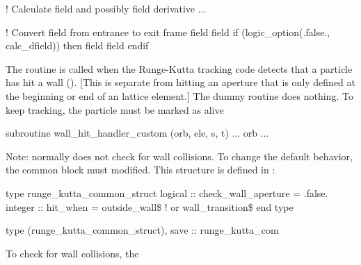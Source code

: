 {{{\begin{example}
  ! Calculate field and possibly field derivative
  ...

  ! Convert field from entrance to exit frame
  field%
  field%
  if (logic_option(.false., calc_dfield)) then
    field%
    field%
  endif
\end{example}


The  routine is called when the
Runge-Kutta tracking code  detects that a particle
has hit a wall (). [This is separate from hitting an
aperture that is only defined at the beginning or end of an lattice
element.] The dummy  routine does nothing.
To keep tracking, the particle must be marked as alive
\begin{example}
  subroutine wall_hit_handler_custom (orb, ele, s, t)
    ...
    orb%
    ...
\end{example}
Note:  normally does not check for wall collisions.
To change the default behavior, the  common block
must modified. This structure is defined in :
\begin{example}
  type runge_kutta_common_struct
    logical :: check_wall_aperture = .false.
    integer :: hit_when = outside_wall\$   ! or wall_transition\$
  end type

  type (runge_kutta_common_struct), save :: runge_kutta_com
\end{example}
To check for wall collisions, the \vn{%
must be set to true. The \vn{%
constitutes a collision. If this is set to \vn{outside_wall\$} (the
default), then any particle that is outside the wall is considered to
have hit the wall. If \vn{%
a collision occurs when the particle crosses the wall boundary. The
distinction between \vn{outside_wall\$} and \vn{wall_transition\$} is
important if particles are to be allowed to travel outside the wall.

\section{Custom Tracking: track1_preprocess and track1_postprocess}
\label{s:custom.track}
\index{track1_preprocess}\index{track1_postprocess}

}}}}}}

